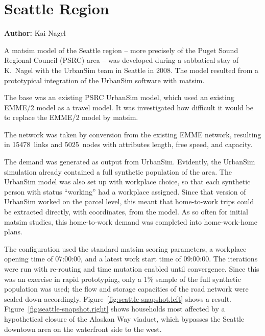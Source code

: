 \section{Seattle Region}
\label{sec:seattle}
\hfill \textbf{Author:} Kai Nagel

A \acrshort{matsim} model of the Seattle region -- more precisely of the Puget Sound Regional Council (PSRC) area -- was developed during a sabbatical stay of K.\ Nagel with the UrbanSim team in Seattle in 2008. The model resulted from a prototypical integration of the UrbanSim software \citep[e.g.][]{WaddellEtc2003UrbanSim} with \acrshort{matsim}. 

The base was an existing PSRC UrbanSim model, which used an existing EMME/2 model   as a travel model. It was investigated how difficult it would be to replace the EMME/2 model by \acrshort{matsim}.

The network was taken by conversion from the existing EMME network, resulting in 15478~links and 5025~nodes with attributes length, free speed, and capacity.

The demand was generated as output from UrbanSim. Evidently, the UrbanSim simulation already contained a full synthetic population of the area. The UrbanSim model was also set up with workplace choice, so that each synthetic person with status ``working'' had a workplace assigned. Since that version of UrbanSim worked on the parcel level, this meant that home-to-work trips could be extracted directly, with coordinates, from the model. As so often for initial \acrshort{matsim} studies, this home-to-work demand was completed into home-work-home plans.

The configuration used the standard \acrshort{matsim} scoring parameters, a workplace opening time of 07:00:00, and a latest work start time of 09:00:00. The iterations were run with re-routing and time mutation enabled until convergence. Since this was an exercise in rapid prototyping, only a 1\% sample of the full synthetic population was used; the flow and storage capacities of the road network were scaled down accordingly. Figure~\ref{fig:seattle-snapshot.left} shows a result. Figure~\ref{fig:seattle-snapshot.right} shows households most affected by a hypothetical closure of the Alaskan Way viaduct, which bypasses the Seattle downtown area on the waterfront side to the west.

